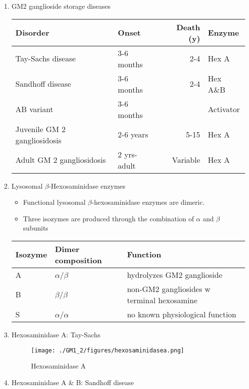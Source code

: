 \documentclass{scrartcl}
\begin{document}
\begin{enumerate}
\item GM2 ganglioside storage diseases
\label{sec:org84dbcac}

\begin{center}
\begin{tabular}{llrl}
Disorder & Onset & Death (y) & Enzyme\\
\hline
Tay-Sachs disease & 3-6 months & 2-4 & Hex A\\
Sandhoff disease & 3-6 months & 2-4 & Hex A\&B\\
AB variant & 3-6 months &  & Activator\\
Juvenile GM 2 gangliosidosis & 2-6 years & 5-15 & Hex A\\
Adult GM 2 gangliosidosis & 2 yrs-adult & Variable & Hex A\\
\end{tabular}
\end{center}


\item Lysosomal \(\beta\)-Hexosaminidase enzymes
\label{sec:orgc916fa7}

\begin{itemize}
\item Functional lysosomal \(\beta\)-hexosaminidase enzymes are dimeric.
\item Three isozymes are produced through the combination of \(\alpha\)
and \(\beta\) subunits
\end{itemize}

\begin{center}
\begin{tabular}{lll}
Isozyme & Dimer composition & Function\\
\hline
A & \(\alpha\)/\(\beta\) & hydrolyzes GM2 ganglioside\\
B & \(\beta\)/\(\beta\) & non-GM2 gangliosides w terminal hexosamine\\
S & \(\alpha\)/\(\alpha\) & no known physiological function\\
\end{tabular}
\end{center}

\item Hexosaminidase A: Tay-Sachs
\label{sec:org07fdd50}

\begin{figure}[htbp]
\centering
\texttt{[image: ./GM1\_2/figures/hexosaminidasea.png]}
\caption{\label{fig:orgd561eac}
Hexosaminidase A}
\end{figure}


\item Hexosaminidase A \& B: Sandhoff disease
\label{sec:org0a0e076}


\end{enumerate}
\end{document}
